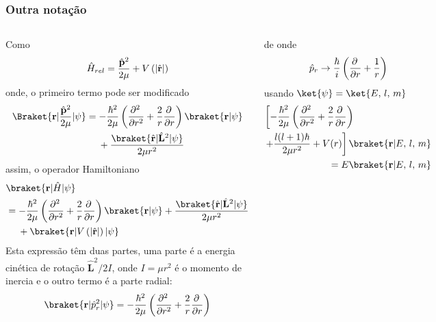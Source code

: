 \documentclass[12pt,brazil,table]{beamer}
\begin{document}

\begin{frame}
  \frametitle{Outra notação}
  \fontsize{7pt}{11pt}\selectfont
  
  \begin{columns}[T]
  
  Como
  \[
    \hat{H}_{rel} = \dfrac{\hat{\mathbf{p}}^2}{2\mu} + V\left(  \left| \hat{\mathbf{r}}\right|\right)\vspace*{-0.15cm}
  \]
  onde, o primeiro termo pode ser modificado
  \[
    \begin{align*}
      \Braket{\mathbf{r}|\dfrac{\hat{\mathbf{p}}^2}{2\mu}|\psi} &= -\dfrac{\hbar^2}{2\mu} \left( \dfrac{\partial^2\, }{\partial r^2} + \dfrac{2}{r}\dfrac{\partial \, }{\partial r} \right)\braket{\mathbf{r}|\psi}\\
      &\;\quad +\dfrac{\braket{\hat{\mathbf{r}}|\hat{\mathbf{L}}^2|\psi}}{2\mu r^2}
    \end{align*}\vspace*{-0.25cm}
  \]
  assim, o operador Hamiltoniano\vspace*{-0.25cm}
  \[
    \begin{align*}
      &\braket{\mathbf{r}|\hat{H}|\psi} \\
      &= -\dfrac{\hbar^2}{2\mu} \left( \dfrac{\partial^2\, }{\partial r^2} + \dfrac{2}{r}\dfrac{\partial \, }{\partial r} \right)\braket{\mathbf{r}|\psi} +\dfrac{\braket{\hat{\mathbf{r}}|\hat{\mathbf{L}}^2|\psi}}{2\mu r^2}\\
      &\;\quad + \braket{\mathbf{r}| V\left(  \left| \hat{\mathbf{r}}\right|\right) |\psi}
    \end{align*}\vspace*{-0.25cm}
  \]
  Esta expressão têm duas partes, uma parte é a energia cinética de rotação $\hat{\mathbf{L}}^2/2I$, onde $I=\mu r^2$ é o momento de inercia e o outro termo é a parte radial:
  \[
   \braket{\mathbf{r}|\hat{p}_r^2|\psi} = -\dfrac{\hbar^2}{2\mu} \left( \dfrac{\partial^2\, }{\partial r^2} + \dfrac{2}{r}\dfrac{\partial \, }{\partial r} \right)\vspace*{-0.25cm}
  \]
  
  \vspace*{-0.8cm}
  
  de onde
  \[
   \hat{p}_r \to \dfrac{\hbar}{i} \left( \dfrac{\partial \, }{\partial r}  +
   \dfrac{1}{r}\right)\vspace*{-0.25cm}
  \]
  usando $\ket{\psi}=\ket{E,\,l,\, m}$
  \[
    \begin{align*}
      \left[  -\dfrac{\hbar^2}{2\mu} \left( \dfrac{\partial^2\, }{\partial r^2} + \dfrac{2}{r}\dfrac{\partial \, }{\partial r} \right) \right. \qquad \qquad\qquad \qquad&\\
    \left. + \dfrac{l(l+1)\hbar}{2\mu r^2} + V(r)\right]\braket{\mathbf{r}|E,\,l,\, m} &\\
   = E\braket{\mathbf{r}|E,\,l,\, m} &
    \end{align*}\vspace*{-0.25cm}
  \]


  \end{columns}

\end{frame}
  
\end{document}
